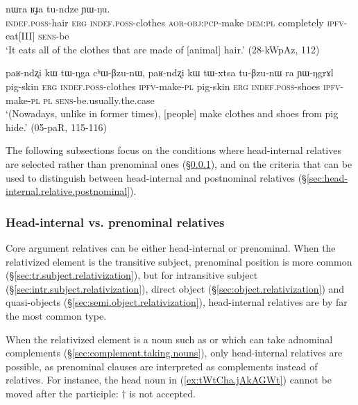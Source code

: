 \begin{exe}
\ex \label{ex:tWNga.thWkABzu}
 nɯra ʁɟa tu-ndze ɲɯ-ŋu. \\
\textsc{indef}.\textsc{poss}-hair \textsc{erg} \textsc{indef}.\textsc{poss}-clothes \textsc{aor}-\textsc{obj}:\textsc{pcp}-make \textsc{dem}:\textsc{pl} completely \textsc{ipfv}-eat[III] \textsc{sens}-be \\
\glt `It eats all of the clothes that are made of [animal] hair.' (28-kWpAz, 112)
\end{exe} 

\begin{exe}
\ex \label{ex:tWNga.chWBzunW}
\gll paʁ-ndʐi kɯ tɯ-ŋga cʰɯ-βzu-nɯ, paʁ-ndʐi kɯ tɯ-xtsa tu-βzu-nɯ ra ɲɯ-ŋgrɤl \\
pig-skin \textsc{erg} \textsc{indef}.\textsc{poss}-clothes \textsc{ipfv}-make-\textsc{pl} pig-skin \textsc{erg} \textsc{indef}.\textsc{poss}-shoes \textsc{ipfv}-make-\textsc{pl} \textsc{pl} \textsc{sens}-be.usually.the.case \\
\glt `(Nowadays, unlike in former times), [people] make clothes and shoes from pig hide.' (05-paR, 115-116)
\end{exe} 

The following subsections focus on the conditions where head-internal relatives are selected rather than prenominal ones (§\ref{sec:head-internal.relative.prenominal}), and on the criteria that can be used to distinguish between head-internal and postnominal relatives (§\ref{sec:head-internal.relative.postnominal}).

\subsubsection{Head-internal vs. prenominal relatives} \label{sec:head-internal.relative.prenominal}
Core argument relatives can be either head-internal or prenominal. When the relativized element is the transitive subject, prenominal position is more common (§\ref{sec:tr.subject.relativization}), but for intransitive subject (§\ref{sec:intr.subject.relativization}), direct object (§\ref{sec:object.relativization}) and quasi-objects (§\ref{sec:semi.object.relativization}), head-internal relatives are by far the most common type. 

When the relativized element is a noun such as  or  which can take adnominal complements (§\ref{sec:complement.taking.nouns}), only head-internal relatives are possible, as prenominal clauses are interpreted as complements instead of relatives. For instance, the head noun  in  (\ref{ex:tWtCha.jAkAGWt}) cannot be moved after the participle: $\dagger$ is not accepted.

